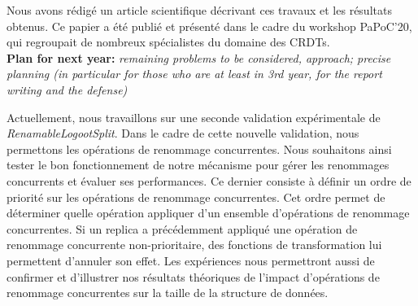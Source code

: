 \documentclass[12pt]{article}
\newcommand{\commentaire}[1]{\small\textit{#1}}
\begin{document}
Nous avons rédigé un article scientifique décrivant ces travaux et les résultats obtenus. Ce papier a été publié et présenté dans le cadre du workshop PaPoC'20, qui regroupait de nombreux spécialistes du domaine des \acp{CRDT}.
\\

\noindent\textbf{Plan for next year:}
\commentaire{%
  remaining problems to be considered, approach; precise planning (in
  particular for those who are at least in 3rd year, for the report
  writing and the defense)\\}


Actuellement, nous travaillons sur une seconde validation expérimentale de \emph{RenamableLogootSplit}.
Dans le cadre de cette nouvelle validation, nous permettons les opérations de renommage concurrentes.
Nous souhaitons ainsi tester le bon fonctionnement de notre mécanisme pour gérer les renommages concurrents et évaluer ses performances.
Ce dernier consiste à définir un ordre de priorité sur les opérations de renommage concurrentes.
Cet ordre permet de déterminer quelle opération appliquer d'un ensemble d'opérations de renommage concurrentes.
Si un replica a précédemment appliqué une opération de renommage concurrente non-prioritaire, des fonctions de transformation lui permettent d'annuler son effet.
Les expériences nous permettront aussi de confirmer et d'illustrer nos résultats théoriques de l'impact d'opérations de renommage concurrentes sur la taille de la structure de données.
\\
\end{document}
